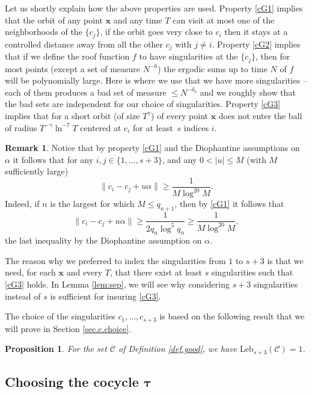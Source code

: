 \documentclass[10pt]{amsart}
\newcommand\cC{\mathcal{C}}
\newcommand\bx{\boldsymbol{x}}
\newcommand\btau{{\boldsymbol{\tau}}}
\newcommand\Leb{\mathrm{Leb}}
\theoremstyle{definition}
\newtheorem{remark}[definition]{Remark}
\theoremstyle{plain}
\newtheorem{proposition}[definition]{Proposition}
\begin{document}
{ Let us shortly explain how the above properties are used. Property \eqref{cG1} implies that the orbit of any point $\bx$ and any time $T$ can visit at most one of the neighborhoods of the $\{c_j\}$, \ie if the orbit goes very close to $c_i$ then it stays at a controlled distance away from all the other $c_j$ with $j\neq i$. Property \eqref{cG2} implies that if we define the roof function $f$ to have singularities at the $\{c_j\}$, then for most points (except a set of measure $N^{-6}$) the ergodic sums up to time $N$ of $f$ will be polynomially large. Here is where we use that we have more singularities -- each of them produces a bad set of measure $\leq N^{-\delta_0}$ and we roughly show that the bad sets are independent for our choice of singularities. Property \eqref{cG3} implies that for a short orbit (of size $T^\gamma$) of every point $\bx$ does not enter the ball of radius $T^{-\gamma}\ln^{-7}T$ centered at $c_i$ for at least~$s$ indices $i$.}

\medskip
\begin{remark}\label{rem:toadd} Notice that by property \eqref{cG1} and the Diophantine assumptions on $\alpha$ it follows that for any $i,j\in \{1,\ldots, s+3\}$, and any $0<|u|\leq M$ (with $M$ sufficiently large)
\[
\|c_i-c_j+u\alpha\|\geq \frac{1}{M\log^{20}M}.
\]
Indeed, if $n$ is the largest for which $M\leq q_{n+1}$, then by \eqref{cG1} it follows that
\[
\|c_i-c_j+u\alpha\|\geq \frac{1}{2q_n\log^5 q_n}\geq \frac{1}{M\log^{20}M},
\]
the last inequality by the Diophantine assumption on $\alpha$.
\end{remark}

The reason why we preferred to index the singularities from $1$ to $s+3$ is that we need, for each
$\bx$ and every $T$, that there exist at least $s$ singularities such that \eqref{cG3} holds. In Lemma \ref{lem:sep}, we will see why considering $s+3$ singularities instead of $s$ is sufficient for insuring \eqref{cG3}.

The choice of the singularities $c_1,\ldots,c_{s+3}$ is based on the following result that we will prove in Section \ref{sec.c.choice}.

\begin{proposition} \label{prop.choice.c} For the set $\cC$ of Definition \ref{def.good}, we have
$\Leb_{s+3}(\cC)=1$.
\end{proposition}

\subsection{Choosing the cocycle $\btau$} \label{sec.tau.choice}
\end{document}
